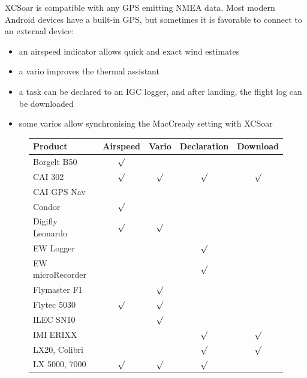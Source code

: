 XCSoar is compatible with any GPS emitting NMEA data.  Most modern
Android devices have a built-in GPS, but sometimes it is favorable to
connect to an external device:

\begin{itemize}
\item an airspeed indicator allows quick and exact wind estimates
\item a vario improves the thermal assistant
\item a task can be declared to an IGC logger, and after landing, the
  flight log can be downloaded
\item some varios allow synchronising the MacCready setting with
  XCSoar
\end{itemize}

\begin{figure}
\begin{tabular}{l|cccc}

Product & Airspeed & Vario & Declaration & Download \\

\hline

Borgelt B50 & $\surd$ \\

CAI 302 & $\surd$ & $\surd$ & $\surd$ & $\surd$ \\

CAI GPS Nav \\

Condor & $\surd$ \\

Digifly Leonardo & $\surd$ & $\surd$ \\

EW Logger &&& $\surd$ \\

EW microRecorder &&& $\surd$ \\

Flymaster F1 && $\surd$ \\

Flytec 5030 & $\surd$ & $\surd$ \\

ILEC SN10 & & $\surd$ \\

IMI ERIXX &&& $\surd$ & $\surd$ \\

LX20, Colibri &&& $\surd$ & $\surd$ \\

LX 5000, 7000 & $\surd$ & $\surd$ & $\surd$ \\


\end{tabular}
\end{figure}
